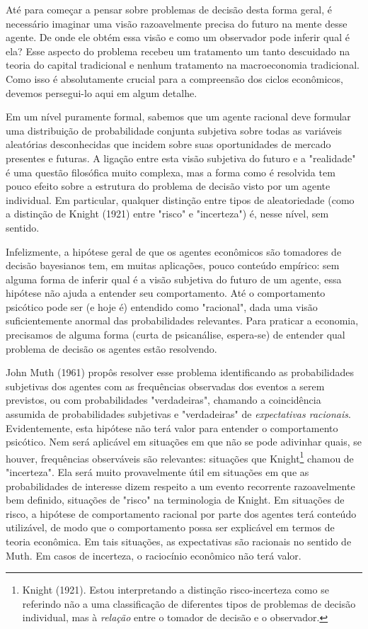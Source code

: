 \documentclass[12pt]{article}
\begin{document}
Até para começar a pensar sobre problemas de decisão desta forma geral, é necessário imaginar uma visão razoavelmente precisa do futuro na mente desse agente. De onde ele obtém essa visão e como um observador pode inferir qual é ela? Esse aspecto do problema recebeu um tratamento um tanto descuidado na teoria do capital tradicional e nenhum tratamento na macroeconomia tradicional. Como isso é absolutamente crucial para a compreensão dos ciclos econômicos, devemos persegui-lo aqui em algum detalhe.

Em um nível puramente formal, sabemos que um agente racional deve formular uma distribuição de probabilidade conjunta subjetiva sobre todas as variáveis aleatórias desconhecidas que incidem sobre suas oportunidades de mercado presentes e futuras. A ligação entre esta visão subjetiva do futuro e a "realidade" é uma questão filosófica muito complexa, mas a forma como é resolvida tem pouco efeito sobre a estrutura do problema de decisão visto por um agente individual. Em particular, qualquer distinção entre tipos de aleatoriedade (como a distinção de Knight (1921) entre "risco" e "incerteza") é, nesse nível, sem sentido.

Infelizmente, a hipótese geral de que os agentes econômicos são tomadores de decisão bayesianos tem, em muitas aplicações, pouco conteúdo empírico: sem alguma forma de inferir qual é a visão subjetiva do futuro de um agente, essa hipótese não ajuda a entender seu comportamento. Até o comportamento psicótico pode ser (e hoje é) entendido como "racional", dada uma visão suficientemente anormal das probabilidades relevantes. Para praticar a economia, precisamos de alguma forma (curta de psicanálise, espera-se) de entender qual problema de decisão os agentes estão resolvendo.

John Muth (1961) propôs resolver esse problema identificando as probabilidades subjetivas dos agentes com as frequências observadas dos eventos a serem previstos, ou com probabilidades "verdadeiras", chamando a coincidência assumida de probabilidades subjetivas e "verdadeiras" de \textit{expectativas racionais}. Evidentemente, esta hipótese não terá valor para entender o comportamento psicótico. Nem será aplicável em situações em que não se pode adivinhar quais, se houver, frequências observáveis são relevantes: situações que Knight\footnote{Knight (1921). Estou interpretando a distinção risco-incerteza como se referindo não a uma classificação de diferentes tipos de problemas de decisão individual, mas à \textit{relação} entre o tomador de decisão e o observador.} chamou de "incerteza". Ela será muito provavelmente útil em situações em que as probabilidades de interesse dizem respeito a um evento recorrente razoavelmente bem definido, situações de "risco" na terminologia de Knight. Em situações de risco, a hipótese de comportamento racional por parte dos agentes terá conteúdo utilizável, de modo que o comportamento possa ser explicável em termos de teoria econômica. Em tais situações, as expectativas são racionais no sentido de Muth. Em casos de incerteza, o raciocínio econômico não terá valor.
\end{document}
